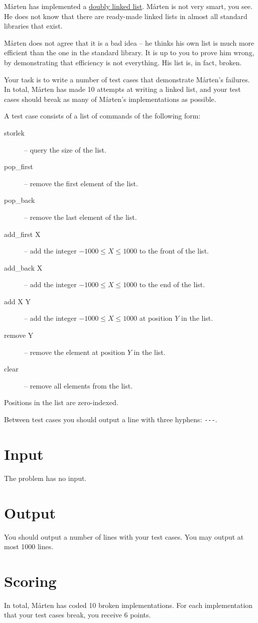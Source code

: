
Mårten has implemented a \href{https://en.wikipedia.org/wiki/Doubly\_linked\_list}{doubly linked list}. Mårten is not very smart, you see. He does not know that there are ready-made linked lists in almost all standard libraries that exist.

Mårten does not agree that it is a bad idea -- he thinks his own list is much more efficient than the one in the standard library. It is up to you to prove him wrong, by demonstrating that efficiency is not everything. His list is, in fact, broken.

Your task is to write a number of test cases that demonstrate Mårten's failures. In total, Mårten has made 10 attempts at writing a linked list, and your test cases should break as many of Mårten's implementations as possible.

A test case consists of a list of commands of the following form:
\begin{description}
	\item[storlek] -- query the size of the list.
	\item[pop\_first] -- remove the first element of the list.
	\item[pop\_back] -- remove the last element of the list.
	\item[add\_first X] -- add the integer $-1000 \le X \le 1000$ to the front of the list.
	\item[add\_back X] -- add the integer $-1000 \le X \le 1000$ to the end of the list.
	\item[add X Y] -- add the integer $-1000 \le X \le 1000$ at position $Y$ in the list.
	\item[remove Y] -- remove the element at position $Y$ in the list.
	\item[clear] -- remove all elements from the list.
\end{description}
Positions in the list are zero-indexed.

Between test cases you should output a line with three hyphens: \texttt{-{}-{}-}.

\section*{Input}
The problem has no input.

\section*{Output}
You should output a number of lines with your test cases. You may output at most 1000 lines.

\section*{Scoring}
In total, Mårten has coded 10 broken implementations. For each implementation that your test cases break, you receive 6 points.
